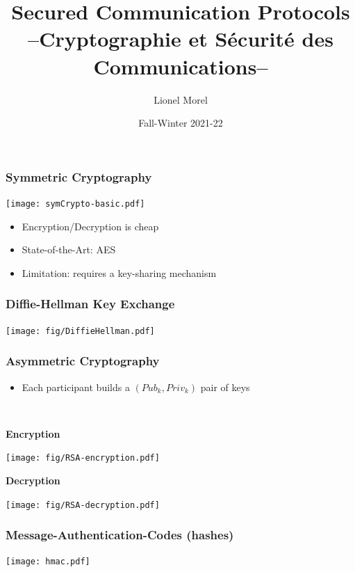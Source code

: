 \documentclass[
hyperref={pdfpagelabels=false}
,xcolor=table
]
{beamer}
\title[CSC - Intro]{Secured Communication Protocols \\ --Cryptographie et Sécurité des Communications--}
\author[]{Lionel Morel}
\institute[]{Telecommunications - INSA Lyon}
\date{Fall-Winter 2021-22}
\begin{document}
\begin{frame}
  \maketitle
\end{frame}

\begin{frame}
  \frametitle{Symmetric Cryptography}

  \begin{center}
    \texttt{[image: symCrypto-basic.pdf]}
  \end{center}

  \begin{itemize}
  \item Encryption/Decryption is cheap
  \item State-of-the-Art: AES
  \item Limitation: requires a key-sharing mechanism
  \end{itemize}
  
\end{frame}


\begin{frame}
  \frametitle{Diffie-Hellman Key Exchange}
  \begin{center}
    \texttt{[image: fig/DiffieHellman.pdf]}
  \end{center}
\end{frame}


\begin{frame}
  \frametitle{Asymmetric Cryptography}

  \begin{itemize}
  \item Each participant builds a $(Pub_k, Priv_k)$ pair of keys
  \end{itemize}

\
  
  \begin{minipage}[t]{.45\textwidth}
    \textbf{Encryption}
    
    \texttt{[image: fig/RSA-encryption.pdf]}
  \end{minipage}
  \hfill
  \begin{minipage}[t]{.45\textwidth}
   \textbf{Decryption}

   \texttt{[image: fig/RSA-decryption.pdf]}
  \end{minipage}
  
\end{frame}


\begin{frame}
  \frametitle{Message-Authentication-Codes (hashes)}

  \begin{center}
    \texttt{[image: hmac.pdf]}
  \end{center}
\end{frame}
\end{document}
